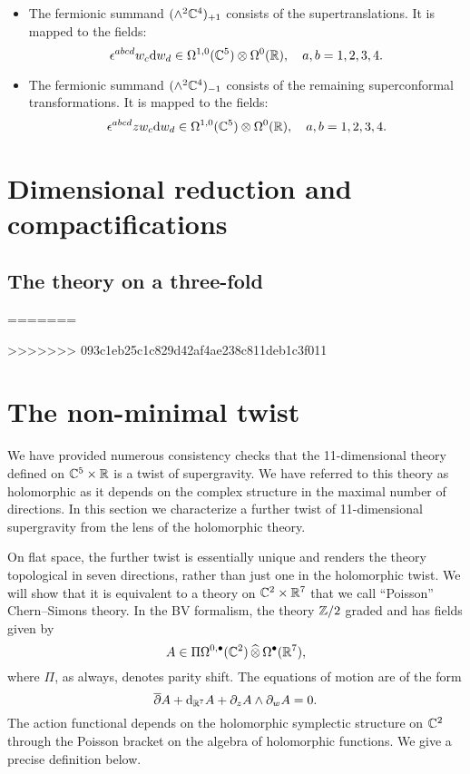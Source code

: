 \documentclass[11pt]{amsart}
\begin{document}
\begin{itemize}
\item 
The fermionic summand $(\wedge^2 \mathbb C^4)_{+1}$ consists of the supertranslations. 
It is mapped to the fields: 
\[
\epsilon^{abcd} w_c {\rm d} w_d \in \Omega^{1,0}(\mathbb C^5) \otimes \Omega^0(\mathbb R) , \quad a,b=1,2,3,4. 
\] 
\item The fermionic summand $(\wedge^2 \mathbb C^4)_{-1}$ consists of the remaining superconformal transformations. 
It is mapped to the fields: 
\[
\epsilon^{abcd} z w_c {\rm d} w_d \in \Omega^{1,0}(\mathbb C^5) \otimes \Omega^0(\mathbb R) , \quad a,b=1,2,3,4. 
\] 
\end{itemize}


\section{Dimensional reduction and compactifications} 


\subsection{The theory on a three-fold}
=======

>>>>>>> 093c1eb25c1c829d42af4ae238c811deb1c3f011


\section{The non-minimal twist} 

We have provided numerous consistency checks that the 11-dimensional theory defined on $\mathbb C^5 \times \mathbb R$ is a twist of supergravity. 
We have referred to this theory as holomorphic as it depends on the complex structure in the maximal number of directions. 
In this section we characterize a further twist of 11-dimensional supergravity from the lens of the holomorphic theory. 

On flat space, the further twist is essentially unique and renders the theory topological in seven directions, rather than just one in the holomorphic twist. 
We will show that it is equivalent to a theory on $\mathbb C^2 \times \mathbb R^7$ that we call ``Poisson'' Chern--Simons theory. 
In the BV formalism, the theory $\mathbb Z/2$ graded and has fields given by
\[
A \in \Pi \Omega^{0,\bullet}(\mathbb C^2) \, \widehat{\otimes} \, \Omega^\bullet(\mathbb R^7) ,
\]
where $\Pi$, as always, denotes parity shift.
The equations of motion are of the form
\[
\overline{\partial} A + {\rm d}_{\mathbb R^7} A + \partial_{z} A \wedge \partial_{w} A = 0 .
\]
The action functional depends on the holomorphic symplectic structure on $\mathbb C^2$ through the Poisson bracket on the algebra of holomorphic functions.
We give a precise definition below. 
\end{document}
